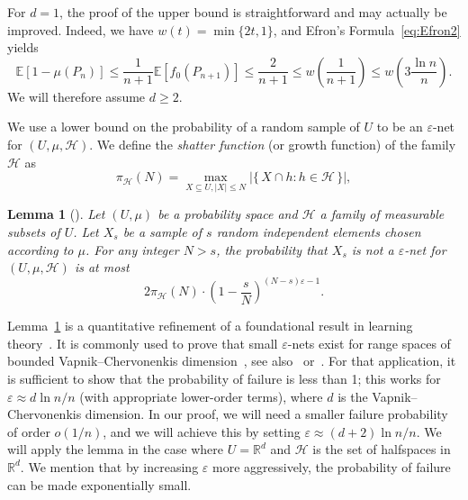 \documentclass[10pt]{amsart}
\newtheorem{lemm}[theo]{Lemma}\newtheorem{prop}[theo]{Proposition}\newtheorem{coro}[theo]{Corollary}\newtheorem{conj}[theo]{Conjecture}
\theoremstyle{definition}\newtheorem{defi}[theo]{Definition}\newtheorem{rema}[theo]{Remark}\newtheorem{exam}[theo]{Example}\newtheorem{exem}[theo]{Example}\newtheorem{nota}[theo]{Notation}
\newcommand{\eps}{\varepsilon}
\newcommand{\Rbb}{\mathbb{R}}%
\newcommand{\Ebb}{\mathbb{E}}%
\newcommand{\Hcal}{\mathcal{H}} %
\newcommand{\pth}[1]{\left(#1 \right)}
\newcommand{\ptb}[1]{\left[#1 \right]}
\newcommand*{\mtfrac}[2]{\frac{#1}{#2}}%
\begin{document}
For $d=1$, the proof of the upper bound is straightforward and may actually be improved. Indeed, we have $w(t)=\min\{2t,1\}$, and Efron's Formula~\eqref{eq:Efron2} yields
\[
\Ebb\ptb{1-\mu(P_n)} \le \frac1{n+1} \Ebb\ptb{f_0(P_{n+1})} \le \frac2{n+1} \le w\pth{\frac{1}{n+1}} \le w\pth{3 \frac{\ln n}{n}}.
\]
We will therefore assume $d\ge2$.

We use a lower bound on the probability of a random sample of $U$ to be an $\eps$-net for $(U, \mu, \Hcal)$. We define the \emph{shatter function} (or growth function) of the family $\Hcal$ as
\[
\pi_{\Hcal}(N) = \max_{X\subseteq U, |X|\le N} |\{\, X\cap h : h \in \Hcal\,\}|,
\]

\begin{lemm}[{\cite[Theorem~3.2]{KPW}}]\label{lemma-shatter}
Let $(U,\mu)$ be a probability space and $\Hcal$ a family of measurable subsets of $U$. Let $X_s$ be a sample of $s$ random independent elements chosen according to $\mu$. For any integer $N> s$, the probability that $X_s$ is not a $\eps$-net for $(U,\mu,\Hcal)$ is at most
\begin{equation}
\nonumber 2\pi_{\Hcal}(N) \cdot \left(1-\mtfrac{s}{N}\right)^{(N-s)\eps-1}.
\end{equation}
\end{lemm}

Lemma~\ref{lemma-shatter} is a quantitative refinement of a foundational result in learning theory~\cite[Theorem~2]{VC}. It is commonly used to prove that small $\eps$-nets exist for range spaces of bounded Vapnik--Chervonenkis dimension~\cite{HW}, see also~\cite[Theorem~3.1]{KPW} or~\cite[Theorem~15.5] {Pach}. For that application, it is sufficient to show that the probability of failure is less than 1; this works for $\eps\approx d \ln n/n$ (with appropriate lower-order terms), where $d$ is the Vapnik--Chervonenkis dimension. In our proof, we will need a smaller failure probability of order $o(1/n)$, and we will achieve this by setting $\eps\approx (d+2) \ln n/n$. We will apply the lemma in the case where $U = \Rbb^d$ and $\Hcal$ is the set of halfspaces in~$\Rbb^d$. We mention that by increasing $\eps$ more aggressively, the probability of failure can be made exponentially small.
\end{document}
